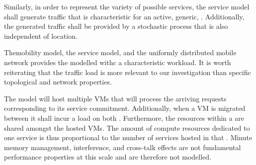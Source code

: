 Similarly, in order to represent the variety of possible services, the service model shall generate traffic that is characteristic for an active, generic, \ue{}. Additionally, the generated traffic shall be provided by a stochastic process that is also independent of location.

Themobility model, the service model, and the uniformly distributed mobile network provides the modelled \dcs{} withc a characteristic workload. It is worth reiterating that the traffic load is more relevant to our investigation than specific topological and network properties.

The \dc{} model will host multiple VMs that will process the arriving requests corresponding to its service commitment. Additionally, when a VM is migrated between \dcs{} it shall incur a load on both \dcs{}. Furthermore, the resources within a \dc{} are shared amongst the hosted VMs. The amount of compute resources dedicated to one service is thus proportional to the number of services hosted in that \dc{}.  Minute memory management, interference, and cross-talk effects are not fundamental performance properties at this scale and are therefore not modelled.
